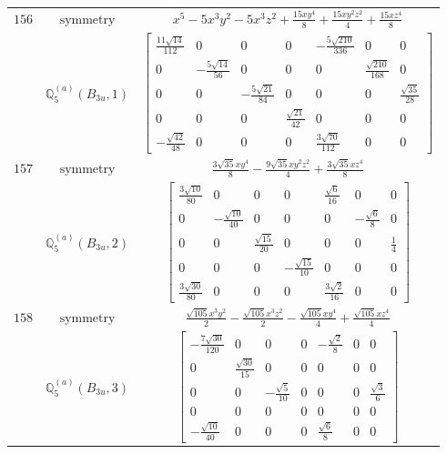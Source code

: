 \documentclass[fleqn,8pt,landscape]{jsarticle}
\begin{document}
\begin{longtable}{ccc}
$ 156 $ & $ \text{symmetry} $ & $ x^{5} - 5 x^{3} y^{2} - 5 x^{3} z^{2} + \frac{15 x y^{4}}{8} + \frac{15 x y^{2} z^{2}}{4} + \frac{15 x z^{4}}{8} $ \\
$  $ & $ \mathbb{Q}_{5}^{(a)}(B_{3u},1) $ & $ \begin{bmatrix} \frac{11 \sqrt{14}}{112} & 0 & 0 & 0 & - \frac{5 \sqrt{210}}{336} & 0 & 0 \\ 0 & - \frac{5 \sqrt{14}}{56} & 0 & 0 & 0 & \frac{\sqrt{210}}{168} & 0 \\ 0 & 0 & - \frac{5 \sqrt{21}}{84} & 0 & 0 & 0 & \frac{\sqrt{35}}{28} \\ 0 & 0 & 0 & \frac{\sqrt{21}}{42} & 0 & 0 & 0 \\ - \frac{\sqrt{42}}{48} & 0 & 0 & 0 & \frac{3 \sqrt{70}}{112} & 0 & 0 \end{bmatrix} $ \\ \hline
$ 157 $ & $ \text{symmetry} $ & $ \frac{3 \sqrt{35} x y^{4}}{8} - \frac{9 \sqrt{35} x y^{2} z^{2}}{4} + \frac{3 \sqrt{35} x z^{4}}{8} $ \\
$  $ & $ \mathbb{Q}_{5}^{(a)}(B_{3u},2) $ & $ \begin{bmatrix} \frac{3 \sqrt{10}}{80} & 0 & 0 & 0 & \frac{\sqrt{6}}{16} & 0 & 0 \\ 0 & - \frac{\sqrt{10}}{40} & 0 & 0 & 0 & - \frac{\sqrt{6}}{8} & 0 \\ 0 & 0 & \frac{\sqrt{15}}{20} & 0 & 0 & 0 & \frac{1}{4} \\ 0 & 0 & 0 & - \frac{\sqrt{15}}{10} & 0 & 0 & 0 \\ \frac{3 \sqrt{30}}{80} & 0 & 0 & 0 & \frac{3 \sqrt{2}}{16} & 0 & 0 \end{bmatrix} $ \\ \hline
$ 158 $ & $ \text{symmetry} $ & $ \frac{\sqrt{105} x^{3} y^{2}}{2} - \frac{\sqrt{105} x^{3} z^{2}}{2} - \frac{\sqrt{105} x y^{4}}{4} + \frac{\sqrt{105} x z^{4}}{4} $ \\
$  $ & $ \mathbb{Q}_{5}^{(a)}(B_{3u},3) $ & $ \begin{bmatrix} - \frac{7 \sqrt{30}}{120} & 0 & 0 & 0 & - \frac{\sqrt{2}}{8} & 0 & 0 \\ 0 & \frac{\sqrt{30}}{15} & 0 & 0 & 0 & 0 & 0 \\ 0 & 0 & - \frac{\sqrt{5}}{10} & 0 & 0 & 0 & \frac{\sqrt{3}}{6} \\ 0 & 0 & 0 & 0 & 0 & 0 & 0 \\ - \frac{\sqrt{10}}{40} & 0 & 0 & 0 & \frac{\sqrt{6}}{8} & 0 & 0 \end{bmatrix} $ \\ \hline

\end{longtable}
\end{document}
